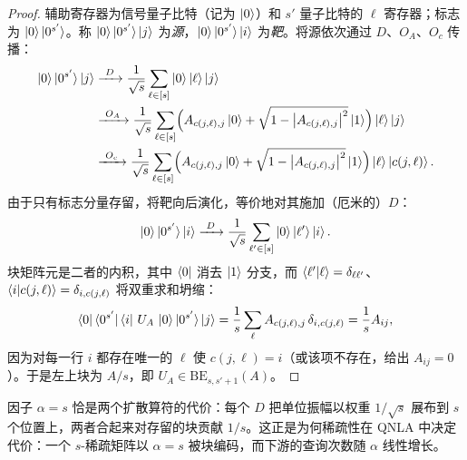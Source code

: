 \begin{proof}
辅助寄存器为信号量子比特（记为 $\ket{0}$）和 $s'$ 量子比特的
$\ell$ 寄存器；标志为 $\ket{0}\ket{0^{s'}}$。称 $\ket{0}\ket{0^{s'}}\ket{j}$
为\emph{源}，$\ket{0}\ket{0^{s'}}\ket{i}$ 为\emph{靶}。将源依次通过 $D$、$O_A$、$O_c$ 传播：
\begin{align*}
  \ket{0}\ket{0^{s'}}\ket{j}
  &\xrightarrow{\ D\ }
    \frac{1}{\sqrt s}\sum_{\ell\in[s]}\ket{0}\ket{\ell}\ket{j}\\
  &\xrightarrow{\ O_A\ }
    \frac{1}{\sqrt s}\sum_{\ell\in[s]}
    \Bigl(A_{c(j,\ell),j}\ket{0}+\sqrt{1-\left\lvert A_{c(j,\ell),j} \right\rvert^2}\ket{1}\Bigr)
    \ket{\ell}\ket{j}\\
  &\xrightarrow{\ O_c\ }
    \frac{1}{\sqrt s}\sum_{\ell\in[s]}
    \Bigl(A_{c(j,\ell),j}\ket{0}+\sqrt{1-\left\lvert A_{c(j,\ell),j} \right\rvert^2}\ket{1}\Bigr)
    \ket{\ell}\ket{c(j,\ell)}.
\end{align*}
由于只有标志分量存留，将靶向后演化，等价地对其施加（厄米的）$D$：
\[
  \ket{0}\ket{0^{s'}}\ket{i}\xrightarrow{\ D\ }
   \frac{1}{\sqrt s}\sum_{\ell'\in[s]}\ket{0}\ket{\ell'}\ket{i}.
\]
块矩阵元是二者的内积，其中 $\bra{0}$ 消去 $\ket{1}$ 分支，而 $\braket{\ell'|\ell}=\delta_{\ell\ell'}$、
$\braket{i|c(j,\ell)}=\delta_{i,c(j,\ell)}$ 将双重求和坍缩：
\[
  \bra{0}\bra{0^{s'}}\bra{i}\,U_A\,\ket{0}\ket{0^{s'}}\ket{j}
  =\frac{1}{s}\sum_{\ell}A_{c(j,\ell),j}\,\delta_{i,c(j,\ell)}
  =\frac{1}{s}A_{ij},
\]
因为对每一行 $i$ 都存在唯一的 $\ell$ 使 $c(j,\ell)=i$（或该项不存在，给出
$A_{ij}=0$）。于是左上块为 $A/s$，即
$U_A\in\mathrm{BE}_{s,s'+1}(A)$。
\end{proof}

因子 $\alpha=s$ 恰是两个扩散算符的代价：每个 $D$ 把单位振幅以权重
$1/\sqrt s$ 展布到 $s$ 个位置上，两者合起来对存留的块贡献
$1/s$。这正是为何稀疏性在 QNLA 中决定代价：一个 $s$-稀疏矩阵以 $\alpha=s$ 被块编码，而下游的查询次数随 $\alpha$ 线性增长。

